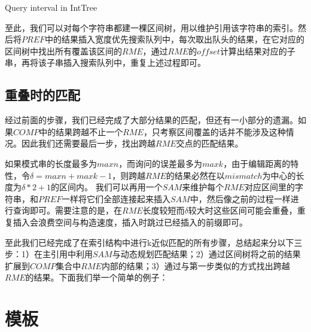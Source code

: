 ﻿\documentclass{sysuthesis}
\begin{document}
\begin{algorithm}[H]
	\caption{Query interval in IntTree}\label{algo_intquery}
\end{algorithm}

至此，我们可以对每个字符串都建一棵区间树，用以维护引用该字符串的索引。然后将$PREF$中的结果插入宽度优先搜索队列中，每次取出队头的结果，在它对应的区间树中找出所有覆盖该区间的$RME$，通过$RME$的$offset$计算出结果对应的子串，再将该子串插入搜索队列中，重复上述过程即可。



\section{重叠时的匹配}
经过前面的步骤，我们已经完成了大部分结果的匹配，但还有一小部分的遗漏。如果$COMP$中的结果跨越不止一个$RME$，只考察区间覆盖的话并不能涉及这种情况。因此我们还需要最后一步，找出跨越$RME$交点的匹配结果。\par
如果模式串的长度最多为$maxn$，而询问的误差最多为$maxk$，由于编辑距离的特性，令$\delta = maxn + maxk - 1$，则跨越$RME$的结果必然在以$mismatch$为中心的长度为$\delta * 2 + 1$的区间内。
我们可以再用一个$SAM$来维护每个$RME$对应区间里的字符串，和$PREF$一样将它们全部连接起来插入$SAM$中，然后像之前的过程一样进行查询即可。需要注意的是，在$RME$长度较短而$\delta$较大时这些区间可能会重叠，重复插入会浪费空间与构造速度，插入时跳过已经插入的前缀即可。\par
至此我们已经完成了在索引结构中进行k近似匹配的所有步骤，总结起来分以下三步：1）在主引用中利用$SAM$与动态规划匹配结果；2）通过区间树将之前的结果扩展到$COMP$集合中$RME$内部的结果；3）通过与第一步类似的方式找出跨越$RME$的结果。下面我们举一个简单的例子：\par




\chapter{模板}
\end{document}
